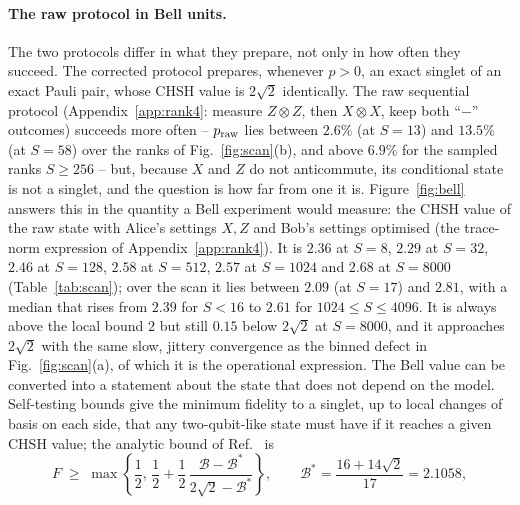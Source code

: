 \documentclass[11pt,a4paper]{article}
\begin{document}
\paragraph{The raw protocol in Bell units.}
The two protocols differ in what they prepare, not only in how often they succeed. The corrected protocol prepares, whenever $p>0$, an exact singlet of an exact Pauli pair, whose CHSH value is $2\sqrt2$ identically. The raw sequential protocol (Appendix~\ref{app:rank4}: measure $Z\otimes Z$, then $X\otimes X$, keep both ``$-$'' outcomes) succeeds more often -- $p_{\rm raw}$ lies between $2.6\%$ (at $S=13$) and $13.5\%$ (at $S=58$) over the ranks of Fig.~\ref{fig:scan}(b), and above $6.9\%$ for the sampled ranks $S\ge256$ -- but, because $X$ and $Z$ do not anticommute, its conditional state is not a singlet, and the question is how far from one it is. Figure~\ref{fig:bell} answers this in the quantity a Bell experiment would measure: the CHSH value of the raw state with Alice's settings $X,Z$ and Bob's settings optimised (the trace-norm expression of Appendix~\ref{app:rank4}). It is $2.36$ at $S=8$, $2.29$ at $S=32$, $2.46$ at $S=128$, $2.58$ at $S=512$, $2.57$ at $S=1024$ and $2.68$ at $S=8000$ (Table~\ref{tab:scan}); over the scan it lies between $2.09$ (at $S=17$) and $2.81$, with a median that rises from $2.39$ for $S<16$ to $2.61$ for $1024\le S\le4096$. It is always above the local bound $2$ but still $0.15$ below $2\sqrt2$ at $S=8000$, and it approaches $2\sqrt2$ with the same slow, jittery convergence as the binned defect in Fig.~\ref{fig:scan}(a), of which it is the operational expression. The Bell value can be converted into a statement about the state that does not depend on the model. Self-testing bounds give the minimum fidelity to a singlet, up to local changes of basis on each side, that any two-qubit-like state must have if it reaches a given CHSH value; the analytic bound of Ref.~\cite{Kaniewski2016} is
\begin{equation}
F\;\ge\;\max\!\left\{\frac12,\,\frac12+\frac12\,\frac{\mathcal B-\mathcal B^*}{2\sqrt2-\mathcal B^*}\right\},\qquad \mathcal B^*=\frac{16+14\sqrt2}{17}=2.1058,
\label{eq:selftest}
\end{equation}
\end{document}
